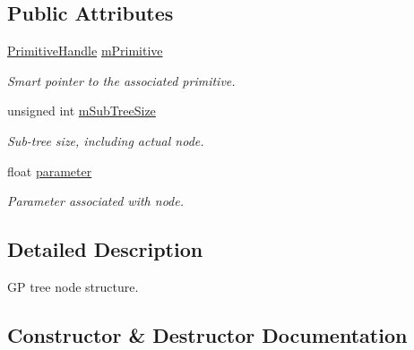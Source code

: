 \subsection*{Public Attributes}
\begin{DoxyCompactItemize}
\item 
\hypertarget{structPuppy_1_1Node_a7be72339910bf7e5333f8a03286c5ec7}{}\hyperlink{classPuppy_1_1PrimitiveHandle}{Primitive\+Handle} \hyperlink{structPuppy_1_1Node_a7be72339910bf7e5333f8a03286c5ec7}{m\+Primitive}\label{structPuppy_1_1Node_a7be72339910bf7e5333f8a03286c5ec7}

\begin{DoxyCompactList}\small\item\em Smart pointer to the associated primitive. \end{DoxyCompactList}\item 
\hypertarget{structPuppy_1_1Node_a047647abeb212563a74933d85306ace0}{}unsigned int \hyperlink{structPuppy_1_1Node_a047647abeb212563a74933d85306ace0}{m\+Sub\+Tree\+Size}\label{structPuppy_1_1Node_a047647abeb212563a74933d85306ace0}

\begin{DoxyCompactList}\small\item\em Sub-\/tree size, including actual node. \end{DoxyCompactList}\item 
\hypertarget{structPuppy_1_1Node_a2bacb0c85f6144192d61dd3af48e7a46}{}float \hyperlink{structPuppy_1_1Node_a2bacb0c85f6144192d61dd3af48e7a46}{parameter}\label{structPuppy_1_1Node_a2bacb0c85f6144192d61dd3af48e7a46}

\begin{DoxyCompactList}\small\item\em Parameter associated with node. \end{DoxyCompactList}\end{DoxyCompactItemize}


\subsection{Detailed Description}
G\+P tree node structure. 

\subsection{Constructor \& Destructor Documentation}
\hypertarget{structPuppy_1_1Node_a766ad2009752aa91f8c5a66753c9d1d7}{}
